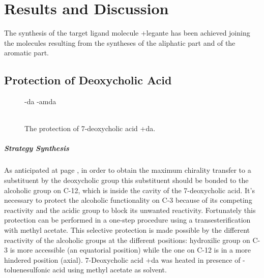 

\chapter{Results and Discussion}
  

  The synthesis of the target ligand molecule \cmpd+{legante} has been achieved joining the molecules resulting from the syntheses of the aliphatic part and of the aromatic part.


\section{Protection of Deoxy\-cholic Acid}

  \begin{figure}
    \cmpdref-{da}
    \cmpdref-{amda}
  \caption{\\ The protection of 7-de\-oxy\-cholic acid \cmpd+{da}.\label{sc:da-amda}}
\end{figure}

\paragraph{Strategy Synthesis}

  As anticipated at page \pageref{dodici}, in order to obtain the maximum chirality transfer to a substituent by the de\-oxy\-cholic group this substituent should be bonded to the alcoholic group on C-12, which is inside the cavity of the 7-de\-oxy\-cholic acid. It's necessary to protect the alcoholic functionality on C-3 because of its competing reactivity and the acidic group to block its unwanted reactivity. Fortunately this protection can be performed in a one-step procedure \cite{CHIN:CHIN199646207} %
  using a transesterification with methyl acetate. This selective protection is made possible by the different reactivity of the alcoholic groups at the different positions: hydroxilic group on C-3 is more accessible (an equatorial position) while the one on C-12 is in a more hindered %
 position (axial). 7-Deoxy\-cholic acid \cmpd+{da} was heated in presence of \p-toluenesulfonic acid using methyl acetate as solvent. 
